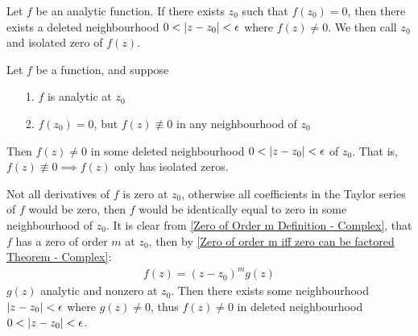 \documentclass[12pt, english]{book}
\makeatletter
\renewenvironment{proof}[1][\proofname]{\par
	\pushQED{\qed}%
	\normalfont \topsep6\p@\@plus6\p@\relax
	\list{}{%
		\settowidth{\leftmargin}{\itshape\proofname:\hskip\labelsep}%
		\setlength{\labelwidth}{0pt}%
		\setlength{\itemindent}{-\leftmargin}%
		}%
	\item[\hskip\labelsep\itshape#1\@addpunct{:}]\ignorespaces
	}{\popQED\endlist\@endpefalse}
\makeatother
\begin{document}
	\begin{definition}
		Let \(f\) be an analytic function. If there exists \(z_0\) such that \(f(z_0) = 0\), then there exists a deleted neighbourhood \(0 < \abs{z-z_0} < \epsilon\) where \(f(z) \neq 0\). We then call \(z_0\) and isolated zero of \(f(z)\).
	\end{definition}
	
	\begin{theorem}
		\label{f nequiv 0 in some neighbourhood of z_0 implies f neq 0 in some deleted neighbourhood of z_0 Theorem - Complex}
		Let \(f\) be a function, and suppose
		\begin{itemize}
			\item[1.] \(f\) is analytic at \(z_0\)
			\item[2.] \(f(z_0) = 0\), but \(f(z) \nequiv 0\) in any neighbourhood of \(z_0\)
		\end{itemize}
		Then \(f(z) \neq 0\) in some deleted neighbourhood \(0<\abs{z-z_0}<\epsilon\) of \(z_0\). That is, \(f(z) \nequiv 0 \implies f(z)\) only has isolated zeros.
	\end{theorem}
	\begin{proof}
		Not all derivatives of \(f\) is zero at \(z_0\), otherwise all coefficients in the Taylor series of \(f\) would be zero, then \(f\) would be identically equal to zero in some neighbourhood of \(z_0\). It is clear from \cref{Zero of Order m Definition - Complex}, that \(f\) has a zero of order \(m\) at \(z_0\), then by \cref{Zero of order m iff zero can be factored Theorem - Complex}:
		\begin{align*}
			f(z) = (z-z_0)^m g(z)
		\end{align*}
		\(g(z)\) analytic and nonzero at \(z_0\). Then there exists some neighbourhood \(\abs{z-z_0}<\epsilon\) where \(g(z) \neq 0\), thus \(f(z) \neq 0\) in deleted neighbourhood \(0 < \abs{z-z_0}<\epsilon\).
	\end{proof}
\end{document}
